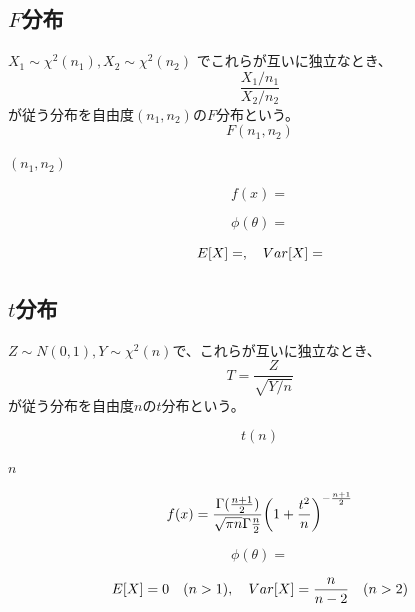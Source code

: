 \subsection{\(F\)分布}

\begin{outline}[description]
  \1 [定義] \(X_1 \sim \chi^2(n_1), X_2 \sim \chi^2(n_2)\) でこれらが互いに独立なとき、
  \begin{equation}
    \frac{X_1/n_1}{X_2/n_2}
  \end{equation}
  が従う分布を自由度\((n_1, n_2)\)の\(F\)分布という。
  \1 [表記]
  \begin{equation}
    F(n_1, n_2)
  \end{equation}
  
  \1 [パラメータ]
  \2
  \2 [自由度] \((n_1, n_2)\)
  
  \1 [密度関数]
  \begin{equation}
    f (x) = 
  \end{equation}
  
  \1 [積率母関数]
  \begin{equation}
    \phi(\theta) = 
  \end{equation}
  
  \1 [期待値・分散]
  \begin{equation}
    E \qty [X] = , \quad Var \qty [ X ] = 
  \end{equation}
  
\end{outline}




\subsection{\(t\)分布}

\begin{outline}[description]
  \1 [定義] \(Z \sim N(0, 1), Y \sim \chi^2(n)\)で、これらが互いに独立なとき、
  \begin{equation}
    T = \frac{Z}{\sqrt{Y/n}}
  \end{equation}
  が従う分布を自由度\(n\)の\(t\)分布という。
  
  \1 [表記]
  \begin{equation}
    t(n)
  \end{equation}
  
  \1 [パラメータ]
  \2
  \2 [自由度] \(n\)
  
  \1 [密度関数]
  \begin{equation}
    f (x) = \frac{\Gamma(\frac{n+1}{2})}{\sqrt{\pi n}\Gamma{\frac{n}{2}}}
    \qty ( 1 + \frac{t^2}{n} )^{- \frac{n+1}{2}}
  \end{equation}
  
  \1 [積率母関数]
  \begin{equation}
    \phi(\theta) = 
  \end{equation}
  
  \1 [期待値・分散]
  \begin{equation}
    E \qty [X] = 0 \quad (n > 1), \quad Var \qty [ X ] = \frac{n}{n - 2} \quad (n > 2)
  \end{equation}
  
\end{outline}


